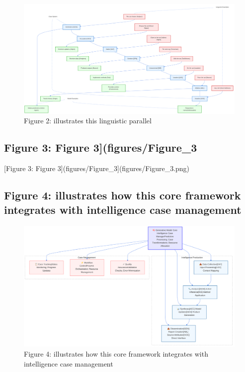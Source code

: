 \documentclass[
  11pt,
  letterpaper,
]{article}
\begin{document}
\begin{figure}
\centering
\includegraphics{figures/Figure_2.png}
\caption{Figure 2: illustrates this linguistic parallel}
\end{figure}

\pagebreak

\hypertarget{figure-3-figure-3figuresfigure_3}{%
\subsection{Figure 3: Figure
3{]}(figures/Figure\_3}\label{figure-3-figure-3figuresfigure_3}}

{[}Figure 3: Figure 3{]}(figures/Figure\_3{]}(figures/Figure\_3.png)

\pagebreak

\hypertarget{figure-4-illustrates-how-this-core-framework-integrates-with-intelligence-case-management}{%
\subsection{Figure 4: illustrates how this core framework integrates
with intelligence case
management}\label{figure-4-illustrates-how-this-core-framework-integrates-with-intelligence-case-management}}

\begin{figure}
\centering
\includegraphics{figures/Figure_4.png}
\caption{Figure 4: illustrates how this core framework integrates with
intelligence case management}
\end{figure}
\end{document}
